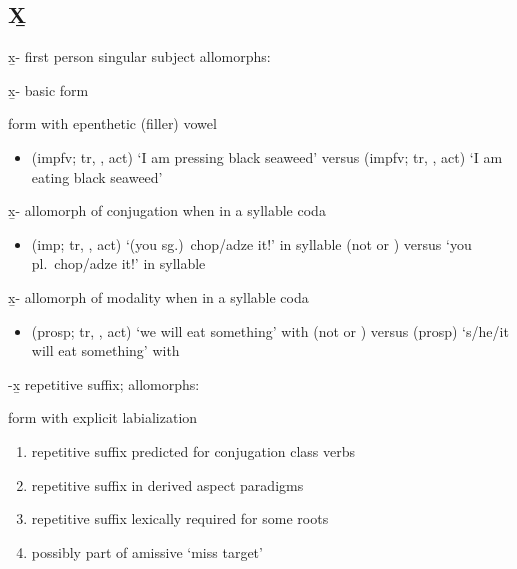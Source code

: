 \subsection{X̱}\label{sec:alphalist-xh}
\begin{morphdesc}[resume*=alphalist]
\item[x̱-]\label{m:x̱-1sg}
	first person singular subject
	\newline
	allomorphs:
	\begin{allolist}
	\item[x̱-]	basic form
	\item[\X{x̱a-}]	form with epenthetic (filler) vowel 
	\end{allolist}
	\begin{itemize}
	\item	{} (impfv; tr, ,  act) ‘I am pressing black seaweed’\newline
		versus  (impfv; tr, ,  act) ‘I am eating black seaweed’
	\end{itemize}

\item[x̱-]\label{m:x̱-g̱cnj}
	allomorph of conjugation  when in a syllable coda
	\begin{itemize}
	\item	{} (imp; tr, ,  act) ‘(you sg.)\ chop/adze it!’ in syllable \newline
		(not  or )\newline
		versus  ‘you pl.\ chop/adze it!’ in syllable \fm{g̱ay}
	\end{itemize}

\item[x̱-]\label{m:x̱-mod}
	allomorph of modality  when in a syllable coda
	\begin{itemize}
	\item	{} (prosp; tr, ,  act) ‘we will eat something’ with \newline
		(not  or )\newline
		versus  (prosp) ‘s/he/it will eat something’ with \fm{g̱a-}
	\end{itemize}

\item[-x̱]\label{m:-x̱}
	repetitive suffix;
	\newline
	allomorphs:
	\begin{allolist}
	\item[\X{-x̱w}]	form with explicit labialization
	\end{allolist}
	\begin{enumerate}
	\item	repetitive suffix predicted for  conjugation class verbs
	\item	repetitive suffix in derived aspect paradigms
	\item	repetitive suffix lexically required for some roots
	\item	possibly part of amissive  ‘miss target’
	\end{enumerate}


\end{morphdesc}
